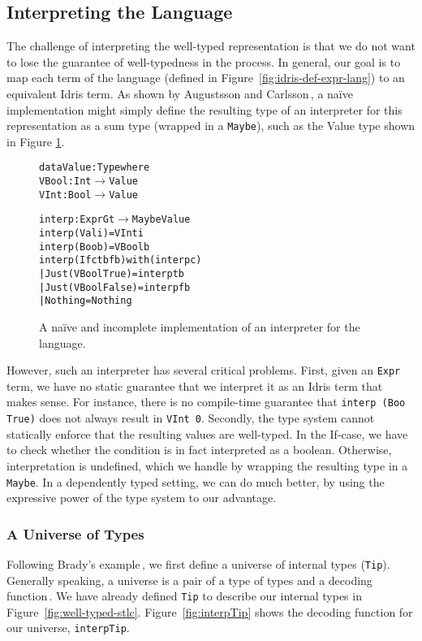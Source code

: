 \subsection{Interpreting the Language}
The challenge of interpreting the well-typed representation is that we do not want to lose the guarantee of well-typedness in the process. In general, our goal is to map each term of the language (defined in Figure~\ref{fig:idris-def-expr-lang}) to an equivalent Idris term. As shown by Augustsson and Carlsson\,\cite{Augustsson99anexercise}, a na\"{i}ve implementation might simply define the resulting type of an interpreter for this representation as a sum type (wrapped in a \texttt{Maybe}), such as the Value type shown in Figure \ref{fig:naive-interpreter-impl}.

\begin{figure}
\begin{alltt}
data Value : Type where
  VBool : Int \(\to\) Value
  VInt  : Bool \(\to\) Value

interp : Expr G t \(\to\) Maybe Value
interp (Val i) = VInt i
interp (Boo b) = VBool b
interp (If c tb fb) with (interp c)
  | Just (VBool True)  = interp tb
  | Just (VBool False) = interp fb
  | Nothing            = Nothing
\end{alltt}
\caption{A na\"{i}ve and incomplete implementation of an interpreter for the language.}
\label{fig:naive-interpreter-impl}
\end{figure}

However, such an interpreter has several critical problems. First, given an \texttt{Expr} term, we have no static guarantee that we interpret it as an Idris term that makes sense. For instance, there is no compile-time guarantee that \texttt{interp (Boo True)} does not always result in \texttt{VInt 0}. Secondly, the type system cannot statically enforce that the resulting values are well-typed. In the If-case, we have to check whether the condition is in fact interpreted as a boolean. Otherwise, interpretation is undefined, which we handle by wrapping the resulting type in a \texttt{Maybe}. In a dependently typed setting, we can do much better, by using the expressive power of the type system to our advantage.

\subsubsection{A Universe of Types}
Following Brady's example\,\cite{Brady:IdrisTutorial}, we first define a universe of internal types (\texttt{Tip}). Generally speaking, a universe is a pair of a type of types and a decoding function\,\cite{Oury:2008}. We have already defined \texttt{Tip} to describe our internal types in Figure~\ref{fig:well-typed-stlc}. Figure~\ref{fig:interpTip} shows the decoding function for our universe, \texttt{interpTip}.

